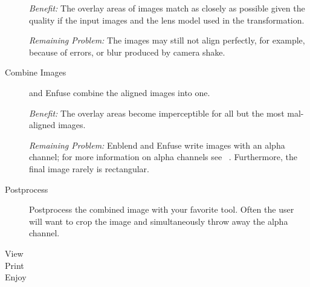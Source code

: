 \begin{description}
  \noindent\emph{Benefit:} The overlay areas of images match as closely as possible given the
  quality if the input images and the lens model used in the transformation.

  \noindent\emph{Remaining Problem:} The images may still not align perfectly, for example,
  because of  errors, or blur produced by camera shake.

\item[Combine Images]\itemend
   and  Enfuse combine the aligned images into one.

  \noindent\emph{Benefit:} The overlay areas become imperceptible for
  all but the most mal-aligned images.

  \noindent\emph{Remaining Problem:} Enblend and Enfuse write images with an alpha channel; for
  more information on alpha channels see \chapterName~.
  Furthermore, the final image rarely is rectangular.

\item[Postprocess]\itemend
  Postprocess the combined image with your favorite tool.  Often the user will want to crop the
  image and simultaneously throw away the alpha channel.

\item[View]

\item[Print]

\item[Enjoy]
\end{description}


